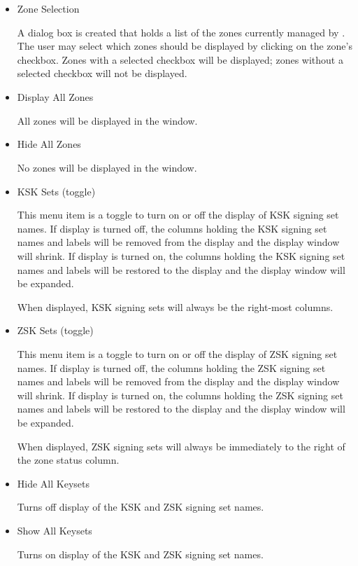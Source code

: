 \begin{itemize}

\item Zone Selection\verb" "

A dialog box is created that holds a list of the zones currently managed by
.  The user may select which zones should be displayed by clicking
on the zone's checkbox.  Zones with a selected checkbox will be displayed;
zones without a selected checkbox will not be displayed.

\item Display All Zones\verb" "

All zones will be displayed in the  window.

\item Hide All Zones\verb" "

No zones will be displayed in the  window.

\item KSK Sets (toggle)\verb" "

This menu item is a toggle to turn on or off the display of KSK signing set
names.  If display is turned off, the columns holding the KSK signing set
names and labels will be removed from the display and the display window will
shrink.  If display is turned on, the columns holding the KSK signing set
names and labels will be restored to the display and the display window will
be expanded.

When displayed, KSK signing sets will always be the right-most columns.

\item ZSK Sets (toggle)\verb" "

This menu item is a toggle to turn on or off the display of ZSK signing set
names.  If display is turned off, the columns holding the ZSK signing set
names and labels will be removed from the display and the display window will
shrink.  If display is turned on, the columns holding the ZSK signing set
names and labels will be restored to the display and the display window will
be expanded.

When displayed, ZSK signing sets will always be immediately to the right of
the zone status column.

\item Hide All Keysets\verb" "

Turns off display of the KSK and ZSK signing set names.

\item Show All Keysets\verb" "

Turns on display of the KSK and ZSK signing set names.

\end{itemize}

